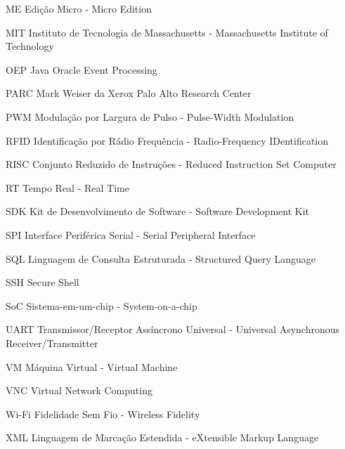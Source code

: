 \begin{siglas}
	\item[ME] Edição Micro - Micro Edition
	\item[MIT] Instituto de Tecnologia de Massachusetts - Massachusetts 	
	Institute of Technology
	\item[OEP] Java Oracle Event Processing
	\item[PARC] Mark Weiser da Xerox Palo Alto Research Center
	\item[PWM] Modulação por Largura de Pulso - Pulse-Width Modulation
	\item[RFID] Identificação por Rádio Frequência - Radio-Frequency 	
	IDentification
	\item[RISC] Conjunto Reduzido de Instruções - Reduced Instruction Set 	
	Computer
	\item[RT] Tempo Real - Real Time
	\item[SDK] Kit de Desenvolvimento de Software - Software Development Kit
	\item[SPI] Interface Periférica Serial - Serial Peripheral Interface
	\item[SQL] Linguagem de Consulta Estruturada - Structured Query Language
	\item[SSH] Secure Shell
	\item[SoC] Sistema-em-um-chip - System-on-a-chip
	\item[UART] Transmissor/Receptor Assíncrono Universal - Universal 	
	Asynchronous Receiver/Transmitter
	\item[VM] Máquina Virtual - Virtual Machine
	\item[VNC] Virtual Network Computing
	\item[Wi-Fi] Fidelidade Sem Fio - Wireless Fidelity
	\item[XML] Linguagem de Marcação Estendida - eXtensible Markup Language
\end{siglas}
